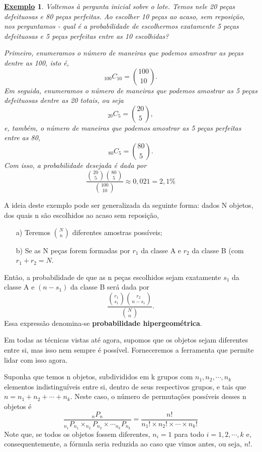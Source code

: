 \documentclass{article}
\newtheorem{example}{\underline{Exemplo}}
\begin{document}
\begin{example}
  Voltemos à pergunta inicial sobre o lote. Temos nele 20 peças defeituosas e 80 peças perfeitas. Ao escolher
  10 peças ao acaso, sem reposição, nos perguntamos - qual é a probabilidade de escolhermos exatamente 5 peças defeituosas
  e 5 peças perfeitas entre as 10 escolhidas?

  Primeiro, enumeramos o número de maneiras que podemos amostrar as peças dentre as 100, isto é, 
  \[
    _{100}C_{10} = \binom{100}{10}.
  \]
  Em seguida, enumeramos o número de maneiras que podemos amostrar as 5 peças defeituosas dentre as 20 totais, ou seja 
  \[
    _{20}C_{5} = \binom{20}{5},
  \]
  e, também, o número de maneiras que podemos amostrar as 5 peças perfeitas entre as 80,
  \[
    _{80}C_{5} = \binom{80}{5}.
  \]
  Com isso, a probabilidade desejada é dada por 
  \[
    \frac{\binom{20}{5}\binom{80}{5}}{\binom{100}{10}} \approx 0,021 = 2,1\%
  \]
\end{example}
A ideia deste exemplo pode ser generalizada da seguinte forma: dados N objetos, dos quais
n são escolhidos ao acaso sem reposição, 
\begin{itemize}
  \item[a)] Teremos \(\binom{N}{n}\) diferentes amostras possíveis;
  \item[b)] Se as N peças forem formadas por \(r_{1}\) da classe A e \(r_{2}\) da classe B (com \(r_{1} + r_{2} = N\).
\end{itemize}
Então, a probabilidade de que as n peças escolhidos sejam exatamente \(s_{1}\) da classe A
e \((n-s_{1})\) da classe B será dada por 
\[
  \frac{\binom{r_{1}}{s_{1}}\binom{r_{2}}{n-s_{1}}}{\binom{N}{n}}.
\]
Essa expressão denomina-se \textbf{probabilidade hipergeométrica}.

Em todas as técnicas vistas até agora, supomos que os objetos sejam diferentes entre si, mas isso nem sempre é possível.
Forneceremos a ferramenta que permite lidar com isso agora. 

Suponha que temos n objetos, subdivididos em k grupos com
\(n_{1}, n_{2}, \cdots, n_{k}\) elementos indistinguíveis entre si, dentro de seus respectivos grupos, 
e tais que \(n = n_{1} + n_{2} + \cdots + n_{k}\). Neste caso, o número de permutações possíveis desses n objetos é 
\[
  \frac{_{n}P_{n}}{_{n_{1}}P_{n_{1}}\times _{n_{2}}P_{n_{2}}\times \cdots _{n_{k}}P_{n_{k}}} = \frac{n!}{n_{1}!\times n_{2}!\times \cdots\times n_{k}!}
\]
Note que, se todos os objetos fossem diferentes, \(n_{i} = 1\) para todo \(i=1, 2, \cdots, k\) e, consequentemente,
a fórmula seria reduzida ao caso que vimos antes, ou seja, \(n!.\)
\end{document}
